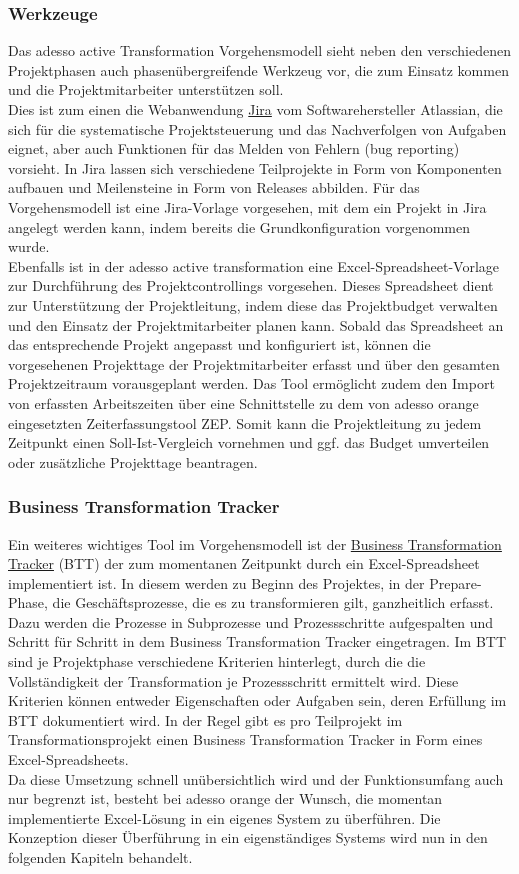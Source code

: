 \subsubsection{Werkzeuge}
Das adesso active Transformation Vorgehensmodell sieht neben den verschiedenen Projektphasen auch phasenübergreifende Werkzeug vor, die zum Einsatz kommen und die Projektmitarbeiter unterstützen soll. \\Dies ist zum einen die Webanwendung \underline{\glqq{}Jira\grqq{}} vom Softwarehersteller Atlassian, die sich für die systematische Projektsteuerung und das Nachverfolgen von Aufgaben eignet, aber auch Funktionen für das Melden von Fehlern (bug reporting) vorsieht. In Jira lassen sich verschiedene Teilprojekte in Form von Komponenten aufbauen und Meilensteine in Form von Releases abbilden. Für das Vorgehensmodell ist eine Jira-Vorlage vorgesehen, mit dem ein Projekt in Jira angelegt werden kann, indem bereits die Grundkonfiguration vorgenommen wurde.\\
Ebenfalls ist in der adesso active transformation eine Excel-Spreadsheet-Vorlage zur Durchführung des Projektcontrollings vorgesehen. Dieses Spreadsheet dient zur Unterstützung der Projektleitung, indem diese das Projektbudget verwalten und den Einsatz der Projektmitarbeiter planen kann. Sobald das Spreadsheet an das entsprechende Projekt angepasst und konfiguriert ist, können die vorgesehenen Projekttage der Projektmitarbeiter erfasst und über den gesamten Projektzeitraum vorausgeplant werden.  
Das Tool ermöglicht zudem den Import von erfassten Arbeitszeiten über eine Schnittstelle zu dem von adesso orange eingesetzten Zeiterfassungstool \glqq{}ZEP\grqq{}. Somit kann die Projektleitung zu jedem Zeitpunkt einen Soll-Ist-Vergleich vornehmen und ggf. das Budget umverteilen oder zusätzliche Projekttage beantragen.

\subsubsection{Business Transformation Tracker}
Ein weiteres wichtiges Tool im Vorgehensmodell ist der \underline{\glqq{}Business Transformation Tracker\grqq{}} (BTT) der zum momentanen Zeitpunkt durch ein Excel-Spreadsheet implementiert ist. In diesem werden zu Beginn des Projektes, in der Prepare-Phase, die Geschäftsprozesse, die es zu transformieren gilt, ganzheitlich erfasst. Dazu werden die Prozesse in Subprozesse und Prozessschritte aufgespalten und Schritt für Schritt in dem Business Transformation Tracker eingetragen. Im BTT sind je Projektphase verschiedene Kriterien hinterlegt, durch die die Vollständigkeit der Transformation je Prozessschritt ermittelt wird. Diese Kriterien können entweder Eigenschaften oder Aufgaben sein, deren Erfüllung im BTT dokumentiert wird. In der Regel gibt es pro Teilprojekt im Transformationsprojekt einen Business Transformation Tracker in Form eines Excel-Spreadsheets.\\
Da diese Umsetzung schnell unübersichtlich wird und der Funktionsumfang auch nur begrenzt ist, besteht bei adesso orange der Wunsch, die momentan implementierte Excel-Lösung in ein eigenes System zu überführen. Die Konzeption dieser Überführung in ein eigenständiges Systems wird nun in den folgenden Kapiteln behandelt.